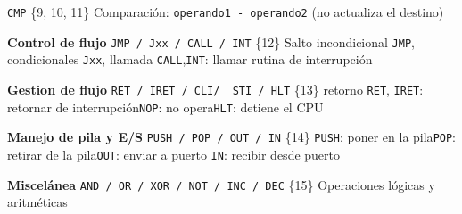 \documentclass[12pt,oneside]{templates/unerthesis}
\begin{document}
\hspace*{0.333em}\hspace*{0.333em}\hspace*{0.333em}\hspace*{0.333em}\hspace*{0.333em}\hspace*{0.333em}\hspace*{0.333em}\hspace*{0.333em}\hspace*{0.333em}\hspace*{0.333em}\hspace*{0.333em}\hspace*{0.333em}\hspace*{0.333em}\hspace*{0.333em}\hspace*{0.333em}\hspace*{0.333em}\hspace*{0.333em}\hspace*{0.333em}\hspace*{0.333em}\hspace*{0.333em}\hspace*{0.333em}\hspace*{0.333em}\hspace*{0.333em}\hspace*{0.333em}\hspace*{0.333em}\hspace*{0.333em}\textbar{} \texttt{CMP} \textbar{} \{9, 10, 11\} \textbar{} Comparación: \texttt{operando1\ -\ operando2} (no actualiza el destino) \textbar{}

\textbf{Control de flujo} \textbar{} \texttt{JMP\ /\ Jxx\ /\ CALL\ /\ INT} \textbar{} \{12\} \textbar{} Salto incondicional \texttt{JMP}, condicionales \texttt{Jxx}, llamada \texttt{CALL},\texttt{INT}: llamar rutina de interrupción \textbar{}

\textbf{Gestion de flujo} \textbar{} \texttt{RET\ /\ IRET\ /\ CLI/\ \ STI\ /\ HLT}\textbar{} \{13\} \textbar{} retorno \texttt{RET}, \texttt{IRET}: retornar de interrupción\texttt{NOP}: no opera\texttt{HLT}: detiene el CPU \textbar{}

\textbf{Manejo de pila y E/S} \textbar{} \texttt{PUSH\ /\ POP\ /\ OUT\ /\ IN} \textbar{} \{14\} \textbar{} \texttt{PUSH}: poner en la pila\texttt{POP}: retirar de la pila\texttt{OUT}: enviar a puerto \texttt{IN}: recibir desde puerto \textbar{}

\textbf{Miscelánea} \textbar{} \texttt{AND\ /\ OR\ /\ XOR\ /\ NOT\ /\ INC\ /\ DEC} \textbar{} \{15\} \textbar{} Operaciones lógicas y aritméticas \textbar{}
\end{document}
